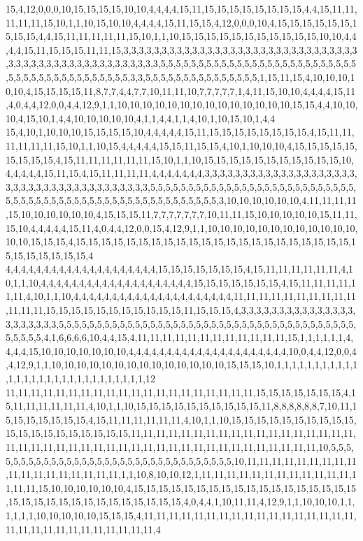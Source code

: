 15,4,12,0,0,0,10,15,15,15,15,10,10,4,4,4,4,15,11,15,15,15,15,15,15,15,15,4,4,15,11,11,11,11,11,15,10,1,1,10,15,10,10,4,4,4,4,15,11,15,15,4,12,0,0,0,10,4,15,15,15,15,15,15,15,15,15,4,4,15,11,11,11,11,11,15,10,1,1,10,15,15,15,15,15,15,15,15,15,15,15,10,10,4,4,4,4,15,11,15,15,15,11,11,15,3,3,3,3,3,3,3,3,3,3,3,3,3,3,3,3,3,3,3,3,3,3,3,3,3,3,3,3,3,3,3,3,3,3,3,3,3,3,3,3,3,3,3,3,3,3,3,3,3,3,3,5,5,5,5,5,5,5,5,5,5,5,5,5,5,5,5,5,5,5,5,5,5,5,5,5,5,5,5,5,5,5,5,5,5,5,5,5,5,5,5,5,5,3,3,5,5,5,5,5,5,5,5,5,5,5,5,5,5,5,1,15,11,15,4,10,10,10,10,10,4,15,15,15,15,11,8,7,7,4,4,7,7,10,11,11,10,7,7,7,7,7,1,4,11,15,10,10,4,4,4,4,15,11,4,0,4,4,12,0,0,4,4,12,9,1,1,10,10,10,10,10,10,10,10,10,10,10,10,10,10,15,15,4,4,10,10,10,4,15,10,1,4,4,10,10,10,10,10,4,1,1,4,4,1,1,4,10,1,10,15,10,1,4,4
15,4,10,1,10,10,10,15,15,15,15,10,4,4,4,4,4,15,11,15,15,15,15,15,15,15,15,4,15,11,11,11,11,11,11,15,10,1,1,10,15,4,4,4,4,4,15,15,11,15,15,4,10,1,10,10,10,4,15,15,15,15,15,15,15,15,15,4,15,11,11,11,11,11,11,15,10,1,1,10,15,15,15,15,15,15,15,15,15,15,15,10,4,4,4,4,4,15,11,15,4,15,11,11,11,11,4,4,4,4,4,4,4,3,3,3,3,3,3,3,3,3,3,3,3,3,3,3,3,3,3,3,3,3,3,3,3,3,3,3,3,3,3,3,3,3,3,3,3,3,3,3,5,5,5,5,5,5,5,5,5,5,5,5,5,5,5,5,5,5,5,5,5,5,5,5,5,5,5,5,5,5,5,5,5,5,5,5,5,5,5,5,5,5,5,5,5,5,5,5,5,5,5,5,5,5,5,3,10,10,10,10,10,10,4,11,11,11,11,15,10,10,10,10,10,10,4,15,15,15,11,7,7,7,7,7,7,7,10,11,11,15,10,10,10,10,10,15,11,11,15,10,4,4,4,4,4,15,11,4,0,4,4,12,0,0,15,4,12,9,1,1,10,10,10,10,10,10,10,10,10,10,10,10,10,10,15,15,15,4,15,15,15,15,15,15,15,15,15,15,15,15,15,15,15,15,15,15,15,15,15,15,15,15,15,15,15,15,15,4
4,4,4,4,4,4,4,4,4,4,4,4,4,4,4,4,4,4,4,4,15,15,15,15,15,15,15,4,15,11,11,11,11,11,11,4,10,1,1,10,4,4,4,4,4,4,4,4,4,4,4,4,4,4,4,4,4,4,4,4,15,15,15,15,15,15,15,4,15,11,11,11,11,11,11,4,10,1,1,10,4,4,4,4,4,4,4,4,4,4,4,4,4,4,4,4,4,4,4,4,4,11,11,11,11,11,11,11,11,11,11,11,11,11,15,15,15,15,15,15,15,15,15,15,15,11,15,15,15,4,3,3,3,3,3,3,3,3,3,3,3,3,3,3,3,3,3,3,3,3,3,3,5,5,5,5,5,5,5,5,5,5,5,5,5,5,5,5,5,5,5,5,5,5,5,5,5,5,5,5,5,5,5,5,5,5,5,5,5,5,5,5,5,5,5,5,4,1,6,6,6,6,10,4,4,15,4,11,11,11,11,11,11,11,11,11,11,11,11,15,1,1,1,1,1,1,4,4,4,4,15,10,10,10,10,10,10,10,4,4,4,4,4,4,4,4,4,4,4,4,4,4,4,4,4,4,4,4,4,10,0,4,4,12,0,0,4,4,12,9,1,1,10,10,10,10,10,10,10,10,10,10,10,10,10,10,15,15,15,10,1,1,1,1,1,1,1,1,1,1,1,1,1,1,1,1,1,1,1,1,1,1,1,1,1,1,1,1,1,12
11,11,11,11,11,11,11,11,11,11,11,11,11,11,11,11,11,11,11,11,15,15,15,15,15,15,15,4,15,11,11,11,11,11,11,4,10,1,1,10,15,15,15,15,15,15,15,15,15,15,11,8,8,8,8,8,8,7,10,11,15,15,15,15,15,15,15,4,15,11,11,11,11,11,11,4,10,1,1,10,15,15,15,15,15,15,15,15,15,15,15,15,15,15,15,15,15,15,15,15,11,11,11,11,11,11,11,11,11,11,11,11,11,11,11,11,11,11,11,11,11,11,11,11,11,11,11,11,11,11,11,11,11,11,11,11,11,11,11,11,11,11,11,10,5,5,5,5,5,5,5,5,5,5,5,5,5,5,5,5,5,5,5,5,5,5,5,5,5,5,5,5,5,5,5,5,5,10,11,11,11,11,11,11,11,11,11,11,11,11,11,11,11,11,11,11,1,1,10,8,10,10,12,1,11,11,11,11,11,11,11,11,11,11,11,11,11,11,11,15,10,10,10,10,10,10,4,15,15,15,15,15,15,15,15,15,15,15,15,15,15,15,15,15,15,15,15,15,15,15,15,15,15,15,15,15,15,15,15,4,0,4,4,1,10,11,11,4,12,9,1,1,10,10,10,1,1,1,1,1,1,10,10,10,10,10,15,15,15,4,11,11,11,11,11,11,11,11,11,11,11,11,11,11,11,11,11,11,11,11,11,11,11,11,11,11,11,11,11,4
